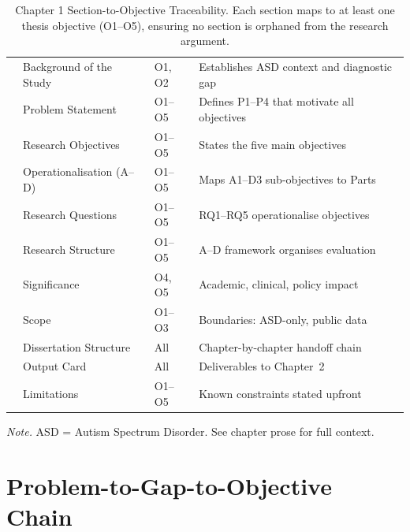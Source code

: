 {\tablestripes\tablefontsize
{}
\begin{xltabular}{\textwidth}{@{} >{\raggedright\arraybackslash}p{1.2cm} >{\raggedright\arraybackslash}p{3.5cm} >{\raggedright\arraybackslash}p{2.0cm} L @{}}
\caption[Chapter 1 Section-to-Objective Traceability]{Chapter 1 Section-to-Objective Traceability. Each section maps to at least one thesis objective (O1--O5), ensuring no section is orphaned from the research argument.}\label{tab:ch1_objective_trace} \\
\toprule
{} &  &  &  \\
\midrule
\endfirsthead
\endhead
\bottomrule
{} & Background of the Study & O1, O2 & Establishes ASD context and diagnostic gap \\
 & Problem Statement & O1--O5 & Defines P1--P4 that motivate all objectives \\
 & Research Objectives & O1--O5 & States the five main objectives \\
 & Operationalisation (A--D) & O1--O5 & Maps A1--D3 sub-objectives to Parts \\
 & Research Questions & O1--O5 & RQ1--RQ5 operationalise objectives \\
 & Research Structure & O1--O5 & A--D framework organises evaluation \\
 & Significance & O4, O5 & Academic, clinical, policy impact \\
 & Scope & O1--O3 & Boundaries: ASD-only, public data \\
 & Dissertation Structure & All & Chapter-by-chapter handoff chain \\
 & Output Card & All & Deliverables to Chapter~2 \\
 & Limitations & O1--O5 & Known constraints stated upfront \\
\end{xltabular}}
\vspace{0.3em}\noindent\textit{Note.} ASD = Autism Spectrum Disorder. See chapter prose for full context.

\section{Problem-to-Gap-to-Objective Chain}

